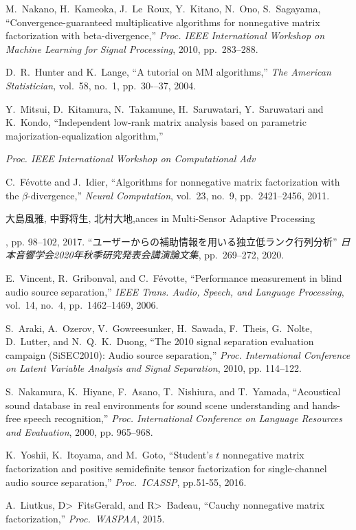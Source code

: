 \documentclass[honka]{nitkagawathesis}%
\begin{document}
\begin{thebibliography}{99}
  M.~Nakano, H.~Kameoka, J.~Le~Roux, Y.~Kitano, N.~Ono, S.~Sagayama, ``Convergence-guaranteed multiplicative algorithms for nonnegative matrix factorization with beta-divergence,''
  {\em Proc. IEEE International Workshop on Machine Learning for Signal Processing}, 2010, pp.~283--288.
  
  D.~R.~Hunter and K.~Lange, ``A tutorial on MM algorithms,'' 
  {\em The American Statistician,} vol.~58, no.~1, pp.~30-–37, 2004.
  
  Y.~Mitsui, D.~Kitamura, N.~Takamune, H.~Saruwatari, Y.~Saruwatari and K.~Kondo, ``Independent low-rank matrix analysis based on parametric majorization-equalization algorithm,'' 
  {\em Proc. IEEE International Workshop on Computational Adv  

  C.~Févotte and J.~Idier, 
  ``Algorithms for nonnegative matrix factorization with the $\beta$-divergence,'' 
  {\em Neural Computation}, vol.~23, no.~9, pp.~2421--2456, 2011.

  大島風雅, 中野将生, 北村大地,ances in Multi-Sensor Adaptive Processing}, pp. 98--102, 2017.
``ユーザーからの補助情報を用いる独立低ランク行列分析''
  {\em 日本音響学会2020年秋季研究発表会講演論文集}, pp.~269--272, 2020.    

  E.~Vincent, R.~Gribonval, and C.~F\'evotte, ``Performance measurement in blind audio source separation,'' 
  {\em IEEE Trans. Audio, Speech, and Language Processing}, vol.~14, no.~4, pp.~1462--1469, 2006.
  
  S.~Araki, A.~Ozerov, V.~Gowreesunker, H.~Sawada, F.~Theis, G.~Nolte, D.~Lutter, and N.~Q.~K.~Duong, 
  ``The 2010 signal separation evaluation campaign (SiSEC2010): Audio source separation,'' 
  {\em Proc. International Conference on Latent Variable Analysis and Signal Separation}, 2010, pp. 114–122.
  
  S.~Nakamura, K.~Hiyane, F.~Asano, T.~Nishiura, and T.~Yamada, 
  ``Acoustical sound database in real environments for sound scene understanding and hands-free speech recognition,'' 
  {\em Proc. International Conference on Language Resources and Evaluation}, 2000, pp. 965–968.

  K.~Yoshii, K.~Itoyama, and M.~Goto, ``Student's $t$ nonnegative matrix factorization and positive semidefinite tensor    
  factorization for single-channel audio source separation,''
  {\em Proc.~ICASSP}, pp.51-55, 2016.

  A.~Liutkus, D>~FitsGerald, and R>~Badeau, ``Cauchy nonnegative matrix factorization,''
  {\em Proc.~WASPAA}, 2015.

\end{thebibliography}
% 
\end{document}
